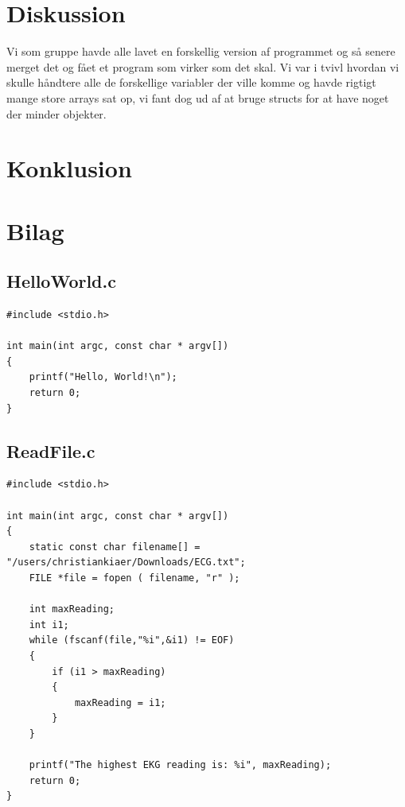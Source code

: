 \documentclass[a4paper,12pt]{article}
\begin{document}
\section{Diskussion}
Vi som gruppe havde alle lavet en forskellig version af programmet og så senere merget det og fået et program som virker som det skal. Vi var i tvivl hvordan vi skulle håndtere alle de forskellige variabler der ville komme og havde rigtigt mange store arrays sat op, vi fant dog ud af at bruge structs for at have noget der minder objekter.
\section{Konklusion}
\newpage
\section{Bilag}
\subsection{HelloWorld.c}
\begin{verbatim}
#include <stdio.h>

int main(int argc, const char * argv[])
{
    printf("Hello, World!\n");
    return 0;
}
\end{verbatim}
\subsection{ReadFile.c}
\begin{verbatim}
#include <stdio.h>

int main(int argc, const char * argv[])
{
    static const char filename[] = "/users/christiankiaer/Downloads/ECG.txt";
    FILE *file = fopen ( filename, "r" );
    
    int maxReading;
    int i1;
    while (fscanf(file,"%i",&i1) != EOF)
    {
        if (i1 > maxReading)
        {
            maxReading = i1;
        }
    }
    
    printf("The highest EKG reading is: %i", maxReading);
    return 0;
}
\end{verbatim}
\end{document}
